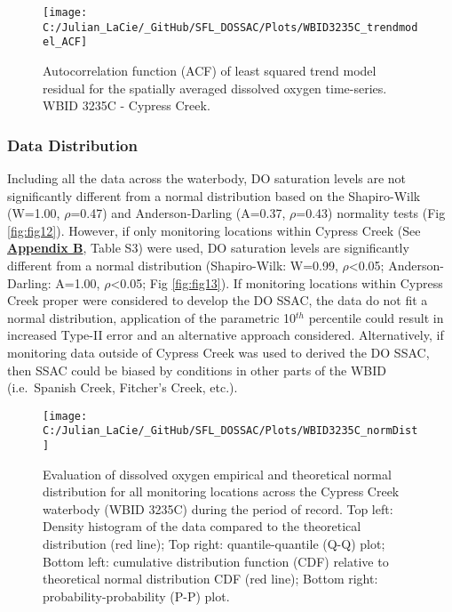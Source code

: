 \documentclass[]{interact}
\theoremstyle{plain}%
\theoremstyle{definition}
\theoremstyle{remark}
\begin{document}
\begin{figure}[H]

{\centering \texttt{[image: C:/Julian\_LaCie/\_GitHub/SFL\_DOSSAC/Plots/WBID3235C\_trendmodel\_ACF]} 

}

\caption{\label{fig:fig11} Autocorrelation function (ACF) of least squared trend model residual for the spatially averaged dissolved oxygen time-series. WBID 3235C - Cypress Creek.}\label{fig:unnamed-chunk-19}
\end{figure}

\hypertarget{data-distribution-2}{%
\subsubsection{Data Distribution}\label{data-distribution-2}}

Including all the data across the waterbody, DO saturation levels are
not significantly different from a normal distribution based on the
Shapiro-Wilk (W=1.00, \(\rho\)=0.47) and Anderson-Darling (A=0.37,
\(\rho\)=0.43) normality tests (Fig \ref{fig:fig12}). However, if only
monitoring locations within Cypress Creek (See
\textbf{\protect\hyperlink{appendix-b}{Appendix B}}, Table S3) were
used, DO saturation levels are significantly different from a normal
distribution (Shapiro-Wilk: W=0.99, \(\rho\)\textless0.05;
Anderson-Darling: A=1.00, \(\rho\)\textless0.05; Fig \ref{fig:fig13}).
If monitoring locations within Cypress Creek proper were considered to
develop the DO SSAC, the data do not fit a normal distribution,
application of the parametric 10\(^{th}\) percentile could result in
increased Type-II error and an alternative approach considered.
Alternatively, if monitoring data outside of Cypress Creek was used to
derived the DO SSAC, then SSAC could be biased by conditions in other
parts of the WBID (i.e.~Spanish Creek, Fitcher's Creek, etc.).

\begin{figure}[H]

{\centering \texttt{[image: C:/Julian\_LaCie/\_GitHub/SFL\_DOSSAC/Plots/WBID3235C\_normDist]} 

}

\caption{\label{fig:fig12} Evaluation of dissolved oxygen empirical and theoretical normal distribution for all monitoring locations across the Cypress Creek waterbody (WBID 3235C) during the period of record. Top left: Density histogram of the data compared to the theoretical distribution (red line); Top right: quantile-quantile (Q-Q) plot; Bottom left: cumulative distribution function (CDF) relative to theoretical normal distribution CDF (red line); Bottom right: probability-probability (P-P) plot.}\label{fig:unnamed-chunk-20}
\end{figure}
\end{document}
